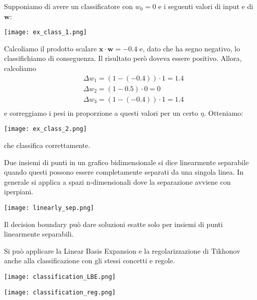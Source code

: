 \begin{example}
	Supponiamo di avere un classificatore con $w_0=0$ e i seguenti valori di input e di $\mathbf{w}$:
	\begin{center}
		\texttt{[image: ex\_class\_1.png]}
	\end{center}
	Calcoliamo il prodotto scalare $\mathbf{x}\cdot \mathbf{w} = -0.4$ e, dato che ha segno negativo, lo classifichiamo di conseguenza. Il risultato però doveva essere positivo. Allora, calcoliamo 
	\begin{align*}
		& \Delta w_1 = (1 - (-0.4)) \cdot 1 = 1.4 \\
		& \Delta w_2 = (1 - 0.5) \cdot 0 = 0 \\
		& \Delta w_3 = (1 - (-0.4)) \cdot 1 = 1.4 \\
	\end{align*}
	e correggiamo i pesi in proporzione a questi valori per un certo $\eta$. Otteniamo:
	\begin{center}
		\texttt{[image: ex\_class\_2.png]}
	\end{center}
	che classifica correttamente.
\end{example}
\newpage
\begin{definition}
	Due insiemi di punti in un grafico bidimensionale si dice linearmente separabile quando questi possono essere completamente separati da una singola linea. In generale si applica a spazi n-dimensionali dove la separazione avviene con iperpiani.
	\begin{center}
		\texttt{[image: linearly\_sep.png]}
	\end{center}
\end{definition}
\begin{note}
	Il decision boundary può dare soluzioni esatte solo per insiemi di punti linearmente separabili.
\end{note}
Si può applicare la Linear Basis Expansion e la regolarizzazione di Tikhonov anche alla classificazione con gli stessi concetti e regole.
\begin{center}
	\begin{minipage}{0.48\linewidth}
		\centering
		\texttt{[image: classification\_LBE.png]}
	\end{minipage}
	\begin{minipage}{0.48\linewidth}
		\centering
		\texttt{[image: classification\_reg.png]}
	\end{minipage}
\end{center}
